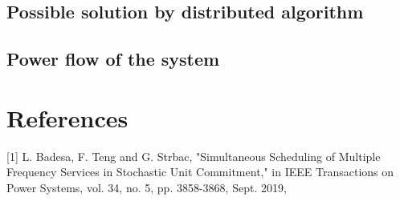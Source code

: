 \documentclass{article}
\begin{document}
\subsection{Possible solution by distributed algorithm}

\subsection{Power flow of the system}

\section*{References}

\medskip

\small

[1] L. Badesa, F. Teng and G. Strbac, "Simultaneous Scheduling of Multiple Frequency Services in Stochastic Unit Commitment," in IEEE Transactions on Power Systems, vol. 34, no. 5, pp. 3858-3868, Sept. 2019,
\end{document}
